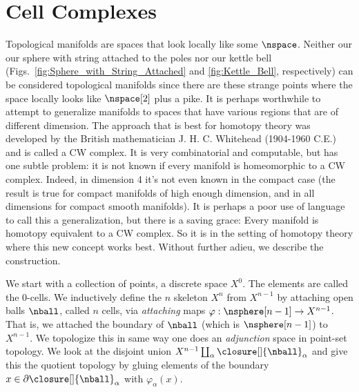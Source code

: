 \documentclass{book}                                                           %
\begin{document}
        \section{Cell Complexes}
            Topological manifolds are spaces that look locally like some
            $\nspace$. Neither our our sphere with string attached to the poles
            nor our kettle bell (Figs.~\ref{fig:Sphere_with_String_Attached} and
            \ref{fig:Kettle_Bell}, respectively) can be considered topological
            manifolds since there are these strange points where the space
            locally looks like $\nspace[2]$ plus a pike. It is perhaps
            worthwhile to attempt to generalize manifolds to spaces that have
            various regions that are of different dimension. The approach that
            is best for homotopy theory was developed by the British
            mathematician J. H. C. Whitehead (1904-1960 C.E.) and is called a
            CW complex. It is very combinatorial and computable, but has one
            subtle problem: it is not known if every manifold is homeomorphic to
            a CW complex. Indeed, in dimension 4 it's not even known in the
            compact case (the result is true for compact manifolds of high
            enough dimension, and in all dimensions for compact smooth
            manifolds). It is perhaps a poor use of language to call this
            a generalization, but there is a saving grace: Every manifold is
            homotopy equivalent to a CW complex. So it is in the setting of
            homotopy theory where this new concept works best. Without further
            adieu, we describe the construction.
            \par\hfill\par
            We start with a collection of points, a discrete space $X^{0}$. The
            elements are called the 0-cells. We inductively define the $n$
            skeleton $X^{n}$ from $X^{n-1}$ by attaching open balls $\nball$,
            called $n$ cells, via \textit{attaching} maps
            $\varphi:\nsphere[n-1]\rightarrow{X}^{n-1}$. That is, we attached
            the boundary of $\nball$ (which is $\nsphere[n-1]$) to $X^{n-1}$.
            We topologize this in same way one does an \textit{adjunction} space
            in point-set topology. We look at the disjoint union
            $X^{n-1}\coprod_{\alpha}\closure[]{\nball}_{\alpha}$ and give this
            the quotient topology by gluing elements of the boundary
            $x\in\partial\closure[]{\nball}_{\alpha}$ with
            $\varphi_{\alpha}(x)$.
\end{document}
